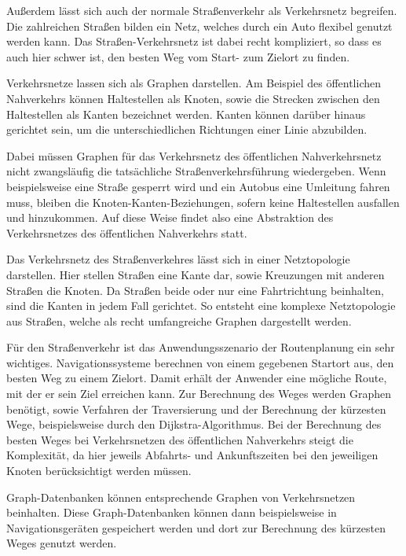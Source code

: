 Außerdem lässt sich auch der normale Straßenverkehr als Verkehrsnetz begreifen. Die zahlreichen Straßen bilden ein Netz, welches durch ein Auto flexibel genutzt werden kann. Das Straßen-Verkehrsnetz ist dabei recht kompliziert, so dass es auch hier schwer ist, den besten Weg vom Start- zum Zielort zu finden.

Verkehrsnetze lassen sich als Graphen darstellen. Am Beispiel des öffentlichen Nahverkehrs können Haltestellen als Knoten, sowie die Strecken zwischen den Haltestellen als Kanten bezeichnet werden. Kanten können darüber hinaus gerichtet sein, um die unterschiedlichen Richtungen einer Linie abzubilden. \cite[p.~74 ff.]{bartelme01}

Dabei müssen Graphen für das Verkehrsnetz des öffentlichen Nahverkehrsnetz nicht zwangsläufig die tatsächliche Straßenverkehrsführung wiedergeben. Wenn beispielsweise eine Straße gesperrt wird und ein Autobus eine Umleitung fahren muss, bleiben die Knoten-Kanten-Beziehungen, sofern keine Haltestellen ausfallen und hinzukommen. Auf diese Weise findet also eine Abstraktion des Verkehrsnetzes des öffentlichen Nahverkehrs statt.  \cite[p.~74 ff.]{bartelme01}

Das Verkehrsnetz des Straßenverkehres lässt sich in einer Netztopologie darstellen. Hier stellen Straßen eine Kante dar, sowie Kreuzungen mit anderen Straßen die Knoten. Da Straßen beide oder nur eine Fahrtrichtung beinhalten, sind die Kanten in jedem Fall gerichtet. So entsteht eine komplexe Netztopologie aus Straßen, welche als recht umfangreiche Graphen dargestellt werden. \cite[p.~122]{bartelme01}

Für den Straßenverkehr ist das Anwendungsszenario der Routenplanung ein sehr wichtiges. Navigationssysteme berechnen von einem gegebenen Startort aus, den besten Weg zu einem Zielort. Damit erhält der Anwender eine mögliche Route, mit der er sein Ziel erreichen kann. \cite[p.~122]{bartelme01} Zur Berechnung des Weges werden Graphen benötigt, sowie Verfahren der Traversierung und der Berechnung der kürzesten Wege, beispielsweise durch den Dijkstra-Algorithmus. Bei der Berechnung des besten Weges bei Verkehrsnetzen des öffentlichen Nahverkehrs steigt die Komplexität, da hier jeweils Abfahrts- und Ankunftszeiten bei den jeweiligen Knoten berücksichtigt werden müssen.

Graph-Datenbanken können entsprechende Graphen von Verkehrsnetzen beinhalten. Diese Graph-Datenbanken können dann beispielsweise in Navigationsgeräten gespeichert werden und dort zur Berechnung des kürzesten Weges genutzt werden.


